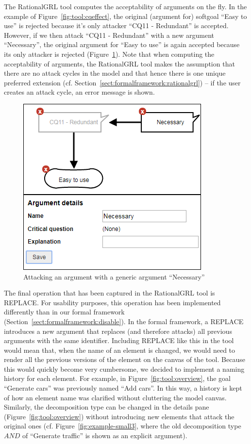 The RationalGRL tool computes the acceptability of arguments on the fly. In the example of Figure~\ref{fig:tool:cqeffect}, the original (argument for) softgoal ``Easy to use'' is rejected because it's only attacker ``CQ11 - Redundant'' is accepted. However, if we then attack ``CQ11 - Redundant'' with a new argument ``Necessary'', the original argument for ``Easy to use'' is again accepted because its only attacker is rejected  (Figure~\ref{fig:tool:argument}). Note that when computing the acceptability of arguments, the RationalGRL tool makes the assumption that there are no attack cycles in the model and that hence there is one unique preferred extension (cf. Section~\ref{sect:formalframework:rationalgrl}) -- if the user creates an attack cycle, an error message is shown. 

\begin{figure}[t]
\centering
\includegraphics[width=0.8\columnwidth]{img/tool/reinstate_softgoal}
\caption{Attacking an argument with a generic argument ``Necessary''}
\label{fig:tool:argument}
\end{figure}

The final operation that has been captured in the RationalGRL tool is \textsf{REPLACE}. For usability purposes, this operation has been implemented differently than in our formal framework (Section~\ref{sect:formalframework:disable}). In the formal framework, a \textsf{REPLACE} introduces a new argument that replaces (and therefore attacks) all previous arguments with the same identifier. Including \textsf{REPLACE} like this in the tool would mean that, when the name of an element is changed, we would need to render all the previous versions of the element on the canvas of the tool. Because this would quickly become very cumbersome, we decided to implement a naming history for each element. For example, in Figure~\ref{fig:tool:overview}, the goal ``Generate cars'' was previously named ``Add cars''. In this way, a history is kept of how an element name was clarified without cluttering the model canvas. Similarly, the decomposition type can be changed in the details pane (Figure~\ref{fig:tool:overview}) without introducing new elements that attack the original ones (cf. Figure~\ref{fig:example-small3}, where the old decomposition type $AND$ of ``Generate traffic'' is shown as an explicit argument).  

